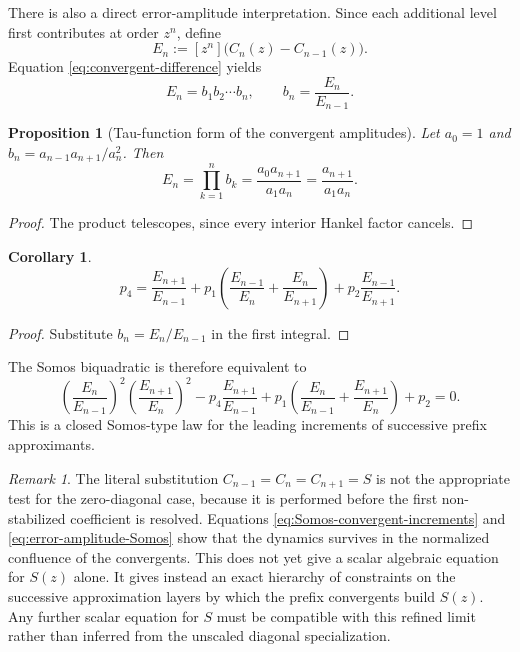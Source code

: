 \documentclass[11pt]{article}
\newtheorem{proposition}[theorem]{Proposition}
\newtheorem{corollary}[theorem]{Corollary}
\theoremstyle{remark}
\newtheorem{remark}[theorem]{Remark}
\begin{document}
There is also a direct error-amplitude interpretation.  Since each additional
level first contributes at order $z^n$, define
\begin{equation}
 E_n:=[z^n]\bigl(C_n(z)-C_{n-1}(z)\bigr).
 \label{eq:error-amplitude}
\end{equation}
Equation \eqref{eq:convergent-difference} yields
\begin{equation}
 E_n=b_1b_2\cdots b_n,
 \qquad b_n=\frac{E_n}{E_{n-1}}.
 \label{eq:error-amplitude-product}
\end{equation}
\begin{proposition}[Tau-function form of the convergent amplitudes]
\label{prop:tau-amplitudes}
Let $a_0=1$ and $b_n=a_{n-1}a_{n+1}/a_n^2$. Then
\begin{equation}
 E_n=\prod_{k=1}^n b_k=\frac{a_0a_{n+1}}{a_1a_n}
 =\frac{a_{n+1}}{a_1a_n}.
 \label{eq:error-amplitude-Hankel}
\end{equation}
\end{proposition}
\begin{proof}
The product telescopes, since every interior Hankel factor cancels.
\end{proof}
\begin{corollary}
\begin{equation}
 p_4=\frac{E_{n+1}}{E_{n-1}}+p_1\left(\frac{E_{n-1}}{E_n}+\frac{E_n}{E_{n+1}}\right)+p_2\frac{E_{n-1}}{E_{n+1}}.
\end{equation}
\end{corollary}
\begin{proof}
Substitute $b_n=E_n/E_{n-1}$ in the first integral.
\end{proof}

The Somos biquadratic is therefore equivalent to
\begin{equation}
 \left(\frac{E_n}{E_{n-1}}\right)^2
 \left(\frac{E_{n+1}}{E_n}\right)^2
 -p_4\frac{E_{n+1}}{E_{n-1}}
 +p_1\left(\frac{E_n}{E_{n-1}}+
 \frac{E_{n+1}}{E_n}\right)+p_2=0.
 \label{eq:error-amplitude-Somos}
\end{equation}
This is a closed Somos-type law for the leading increments of successive
prefix approximants.

\begin{remark}
The literal substitution $C_{n-1}=C_n=C_{n+1}=S$ is not the appropriate test
for the zero-diagonal case, because it is performed before the first
non-stabilized coefficient is resolved.  Equations
\eqref{eq:Somos-convergent-increments} and
\eqref{eq:error-amplitude-Somos} show that the dynamics survives in the
normalized confluence of the convergents.  This does not yet give a scalar
algebraic equation for $S(z)$ alone.  It gives instead an exact hierarchy of
constraints on the successive approximation layers by which the prefix
convergents build $S(z)$.  Any further scalar equation for $S$ must be
compatible with this refined limit rather than inferred from the unscaled
diagonal specialization.
\end{remark}
\end{document}
